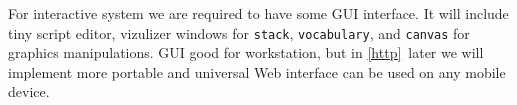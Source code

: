 \pagebreak
{}\label{wx}\secdown

For interactive system we are required to have some GUI interface. It will
include tiny script editor, vizulizer windows for \verb|stack|,
\verb|vocabulary|, and \verb|canvas| for graphics manipulations. GUI good for
workstation, but in \ref{http}\ later we will implement more portable and
universal Web interface can be used on any mobile device.

\secup
